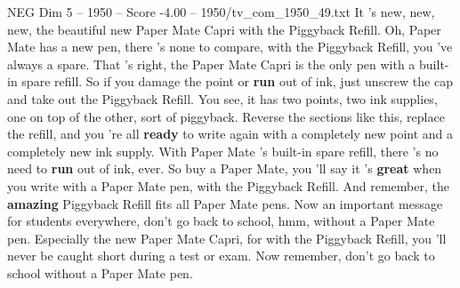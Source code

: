 \begin{textsample}{NEG Dim 5 – 1950 – Score -4.00 – 1950/tv\_com\_1950\_49.txt}  \label{ex:f5_neg_047}
It 's new, new, new, the beautiful new Paper Mate Capri with the Piggyback Refill.
Oh, Paper Mate has a new pen, there 's none to compare, with the Piggyback Refill, you 've always a spare.
That 's right, the Paper Mate Capri is the only pen with a built-in spare refill.
So if you damage the point or \textbf{run} out of ink, just unscrew the cap and take out the Piggyback Refill.
You see, it has two points, two ink supplies, one on top of the other, sort of piggyback.
Reverse the sections like this, replace the refill, and you 're all \textbf{ready} to write again with a completely new point and a completely new ink supply.
With Paper Mate 's built-in spare refill, there 's no need to \textbf{run} out of ink, ever.
So buy a Paper Mate, you 'll say it 's \textbf{great} when you write with a Paper Mate pen, with the Piggyback Refill.
And remember, the \textbf{amazing} Piggyback Refill fits all Paper Mate pens.
Now an important message for students everywhere, don't go back to school, hmm, without a Paper Mate pen.
Especially the new Paper Mate Capri, for with the Piggyback Refill, you 'll never be caught short during a test or exam.
Now remember, don't go back to school without a Paper Mate pen.

\end{textsample}
